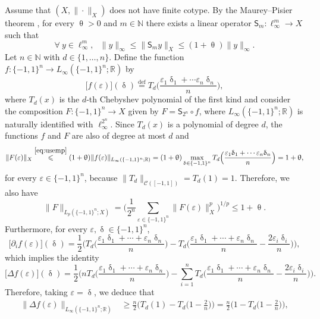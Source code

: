 \documentclass[11pt,reqno]{amsart}
\renewcommand{\leq}{\leqslant}
\renewcommand{\geq}{\geqslant}
\newcommand{\e}{\varepsilon}
\newcommand{\R}{\mathbb R}
\newcommand{\1}{\mathbf 1}
\theoremstyle{remark}
\newcommand{\N}{\mathbb N}
\newcommand{\eqdef}{\stackrel{\mathrm{def}}{=}}
\renewcommand{\theta}{\uptheta}
\renewcommand{\delta}{\updelta}
\newcommand{\ms}{\mathscr}
\newcommand{\msf}{\mathsf}
\begin{document}
 Assume that $(X,\|\cdot\|_X)$ does not have finite cotype. By the Maurey--Pisier theorem \cite{MP76}, for every $\theta>0$ and $m\in\N$ there exists a linear operator $\msf{S}_m:\ell_\infty^m\to X$ such that
\begin{equation} \label{eq:usemp}
\forall \ y\in\ell_\infty^m, \ \ \ \|y\|_\infty \leq \|\msf{S}_my\|_X \leq (1+\theta)\|y\|_\infty.
\end{equation}
Let $n\in\N$ with $d\in\{1,\ldots,n\}$. Define the function $f:\{-1,1\}^n \to L_\infty(\{-1,1\}^n;\R)$ by
\begin{equation}
\big[ f(\e) \big] (\delta) \eqdef T_d\Big(\frac{\e_1\delta_1+\cdots\e_n\delta_n}{n}\Big),
\end{equation}
where $T_d(x)$ is the $d$-th Chebyshev polynomial of the first kind and consider the composition $F: \{-1,1\}^n\to X$ given by $F=\msf{S}_{2^n}\circ f$, where $L_\infty(\{-1,1\}^n;\R)$ is naturally identified with $\ell_\infty^{2^n}$. Since $T_d(x)$ is a polynomial of degree $d$, the functions $f$ and $F$ are also of degree at most $d$ and
\begin{equation}
\|F(\e)\|_X \stackrel{\eqref{eq:usemp}}{\leq}(1+\theta) \|f(\e)\|_{L_\infty(\{-1,1\}^n;\R)} = (1+\theta) \max_{\delta\in\{-1,1\}^n} T_d\Big(\frac{\e_1\delta_1+\cdots\e_n\delta_n}{n}\Big) = 1+\theta,
\end{equation}
for every $\e\in\{-1,1\}^n$, because $\|T_d\|_{\ms{C}([-1,1])} = T_d(1)=1$. Therefore, we also have 
\begin{equation} \label{eq:Fformp}
\|F\|_{L_p(\{-1,1\}^n;X)} = \Big( \frac{1}{2^n} \sum_{\e\in\{-1,1\}^n} \|F(\e)\|_X^p\Big)^{1/p} \leq 1+\theta.
\end{equation}
Furthermore, for every $\e,\delta\in\{-1,1\}^n$,
\begin{equation}
\big[\partial_i f(\e)\big](\delta) = \frac{1}{2}\Big(T_d\Big(\frac{\e_1\delta_1+\cdots+ \e_n\delta_n}{n}\Big) - T_d\Big(\frac{\e_1\delta_1+\cdots+\e_n\delta_n}{n} - \frac{2\e_i\delta_i}{n}\Big)\Big),
\end{equation}
which implies the identity
\begin{equation}
\big[\Delta f(\e)\big](\delta) = \frac{1}{2}\Big(n T_d\Big(\frac{\e_1\delta_1+\cdots+\e_n\delta_n}{n}\Big) - \sum_{i=1}^n T_d\Big(\frac{\e_1\delta_1+\cdots+\e_n\delta_n}{n} - \frac{2\e_i\delta_i}{n}\Big)\Big).
\end{equation}
Therefore, taking $\e=\delta$, we deduce that
\begin{equation} \label{eq:cosinecompute}
\begin{split}
\|\Delta f(\e)\|_{L_\infty(\{-1,1\}^n;\R)}& \geq \frac{n}{2} \Big( T_d(1) - T_d\Big(1-\frac{2}{n}\Big)\Big) = \frac{n}{2} \Big( 1 - T_d\Big(1-\frac{2}{n}\Big)\Big),
\end{split}
\end{equation}
\end{document}
